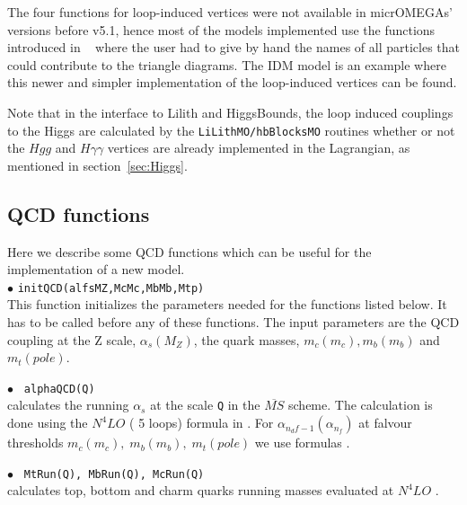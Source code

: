 \documentclass[12pt,a4paper]{article}
\begin{document}
The four functions for loop-induced vertices were not available in micrOMEGAs' versions before v5.1, hence most of the models implemented use the functions introduced in ~\cite{Belanger:2013oya} where the user had to give by hand the names of all particles that could contribute to the triangle diagrams. The IDM model is an example where this newer and simpler implementation of the loop-induced vertices can be found. 

Note that in the interface to Lilith and HiggsBounds, the loop induced couplings to the Higgs  are calculated by the {\tt LiLithMO/hbBlocksMO}  routines whether or not the $Hgg$ and $H\gamma\gamma$ vertices are already implemented in the Lagrangian, as mentioned in section~\ref{sec:Higgs}. 




\subsection{QCD functions}
Here we describe some QCD functions which can be useful for the implementation of a new model.\\
\noindent$\bullet$ \verb|initQCD(alfsMZ,McMc,MbMb,Mtp)|\\
This function initializes the parameters needed for the functions
listed below. It has to be called before any of these functions.
The input parameters are the QCD coupling at the Z scale,
$\alpha_s(M_Z)$, the quark masses, $m_c(m_c), m_b(m_b)$ and
$m_t(pole)$.

\noindent$\bullet$ \verb| alphaQCD(Q)|\\
calculates the  running $\alpha_s$ at the scale \verb|Q| in the
$\overline{MS}$ scheme. The calculation is done using the
$N^4LO$ ( 5 loops) formula in \cite{ParticleDataGroup:2020ssz, Baikov_2017}. For $\alpha_{n_df-1}(\alpha_{n_f})$
at  falvour thresholds  $m_c(m_c),\; m_b(m_b),\; m_t(pole)$  we use formulas \cite{Chetyrkin_2006}.

\noindent$\bullet$ \verb| MtRun(Q), MbRun(Q), McRun(Q) | \\
calculates top, bottom and charm quarks running masses evaluated
at $N^4LO$ \cite{Baikov_2014}.
 
\end{document}
